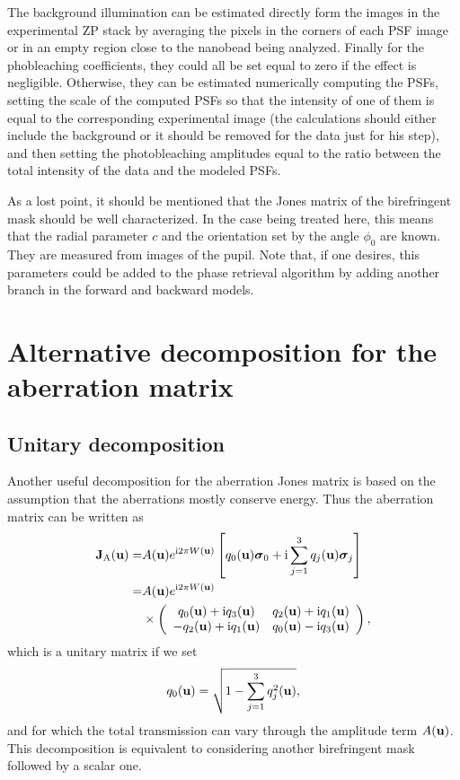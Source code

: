 \documentclass[reprint,aps,pra,superscriptaddress,
amsmath,amssymb]{revtex4-1}
\begin{document}
The background illumination can be estimated directly form the images in the experimental ZP stack by averaging the pixels in the corners of each PSF image or in an empty region close to the nanobead being analyzed. Finally for the phobleaching coefficients, they could all be set equal to zero if the effect is negligible. Otherwise, they can be estimated numerically computing the PSFs, setting the scale of the computed PSFs so that the intensity of one of them is equal to the corresponding experimental image (the calculations should either include the background or it should be removed for the data just for his step), and then setting the photobleaching amplitudes equal to the ratio between the total intensity of the data and the modeled PSFs. 

As a lost point, it should be mentioned that the Jones matrix of the birefringent mask should be well characterized. In the case being treated here, this means that the radial parameter $c$ and the orientation set by the angle $\phi_0$ are known. They are measured from images of the pupil. Note that, if one desires, this parameters could be added to the phase retrieval algorithm by adding another branch in the forward and backward models.

\section{Alternative decomposition for the aberration matrix}

\subsection{Unitary decomposition}

Another useful decomposition for the aberration Jones matrix is based on the assumption that the aberrations mostly conserve energy. Thus the aberration matrix can be written as
\begin{align*}
\textbf J_\text{A}(\textbf u) =&A(\textbf u ) e^{\text{i} 2 \pi W(\textbf u) } \left[ q_0(\textbf u)\boldsymbol \sigma_0+  \text{i} \sum_{j=1}^3 q_j (\textbf u)   \boldsymbol \sigma_j \right]\\
= & 
A(\textbf u ) e^{\text{i} 2 \pi W(\textbf u) } \\
& \times
\left(
\begin{array}{cc}
q_0 (\textbf u)  + \text{i} q_3 (\textbf u) & q_2(\textbf u) + \text{i} q_1(\textbf u)   \\
-q_2 (\textbf u) + \text{i} q_1 (\textbf u)  & q_0(\textbf u) - \text{i} q_3(\textbf u) 
\end{array}
\right),
\end{align*}
which is a unitary matrix if we set
\begin{align}
q_0(\textbf u) = \sqrt{1-\sum_{j=1}^3 q_j^2(\textbf u)},
\end{align}
and  for which the total transmission can vary through the amplitude term $A(\textbf u )$. This decomposition is equivalent to considering another birefringent mask followed by a scalar one. 
\end{document}
